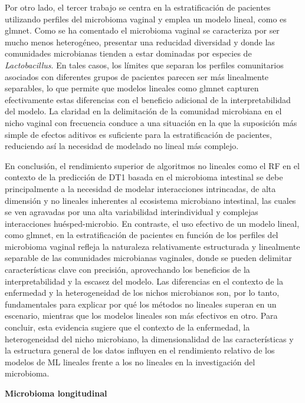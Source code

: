 Por otro lado, el tercer trabajo \cite{paper3} se centra en la estratificación de pacientes utilizando perfiles del microbioma vaginal y emplea un modelo lineal, como es glmnet. Como se ha comentado el microbioma vaginal se caracteriza por ser mucho menos heterogéneo, presentar una reducidad diversidad y donde las comunidades microbianas tienden a estar dominadas por especies de \textit{Lactobacillus}. En tales casos, los límites que separan los perfiles comunitarios asociados con diferentes grupos de pacientes parecen ser más linealmente separables, lo que permite que modelos lineales como glmnet capturen efectivamente estas diferencias con el beneficio adicional de la interpretabilidad del modelo. La claridad en la delimitación de la comunidad microbiana en el nicho vaginal con frecuencia conduce a una situación en la que la suposición más simple de efectos aditivos es suficiente para la estratificación de pacientes, reduciendo así la necesidad de modelado no lineal más complejo.

En conclusión, el rendimiento superior de algoritmos no lineales como el RF en el contexto de la predicción de DT1 basada en el microbioma intestinal \cite{paper2} se debe principalmente a la necesidad de modelar interacciones intrincadas, de alta dimensión y no lineales inherentes al ecosistema microbiano intestinal, las cuales se ven agravadas por una alta variabilidad interindividual y complejas interacciones huésped-microbio. En contraste, el uso efectivo de un modelo lineal, como glmnet, en la estratificación de pacientes en función de los perfiles del microbioma vaginal \cite{paper3} refleja la naturaleza relativamente estructurada y linealmente separable de las comunidades microbianas vaginales, donde se pueden delimitar características clave con precisión, aprovechando los beneficios de la interpretabilidad y la escasez del modelo. Las diferencias en el contexto de la enfermedad y la heterogeneidad de los nichos microbianos son, por lo tanto, fundamentales para explicar por qué los métodos no lineales superan en un escenario, mientras que los modelos lineales son más efectivos en otro. Para concluir, esta evidencia sugiere que el contexto de la enfermedad, la heterogeneidad del nicho microbiano, la dimensionalidad de las características y la estructura general de los datos influyen en el rendimiento relativo de los modelos de ML lineales frente a los no lineales en la investigación del microbioma.


\textbf{Microbioma longitudinal}

